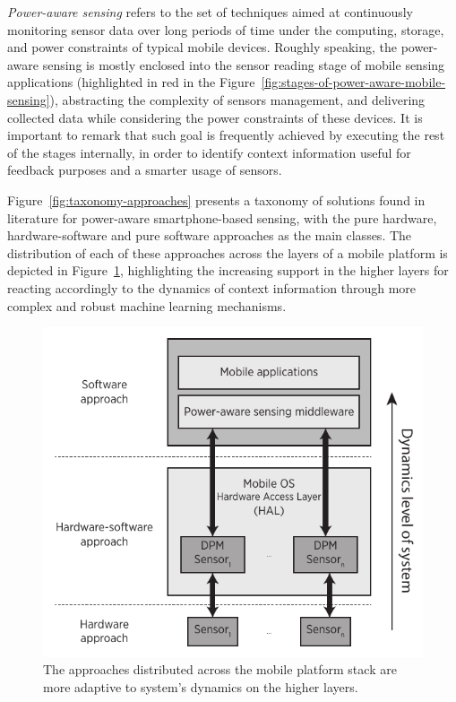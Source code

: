 \documentclass[ENG,PhD]{cinvestav}
\begin{document}
\emph{Power-aware sensing} refers to the set of techniques aimed at continuously monitoring sensor data over long periods of time under the computing, storage, and power constraints of typical mobile devices.
Roughly speaking, the power-aware sensing is mostly enclosed into the sensor reading stage of mobile sensing applications (highlighted in red in the Figure~\ref{fig:stages-of-power-aware-mobile-sensing}), abstracting the complexity of sensors management, and delivering collected data while considering the power constraints of these devices. 
It is important to remark that such goal is frequently achieved by executing the rest of the stages internally, in order to identify context information useful for feedback purposes and a smarter usage of sensors.

Figure~\ref{fig:taxonomy-approaches} presents a taxonomy of solutions found in literature for power-aware smartphone-based sensing, with the pure hardware, hardware-software and pure software approaches as the main classes.
The distribution of each of these approaches across the layers of a mobile platform is depicted in Figure~\ref{fig:distribution-approaches}, highlighting the increasing support in the higher layers for reacting accordingly to the dynamics of context information through more complex and robust machine learning mechanisms.
\begin{figure}[t]
  \centering
  \includegraphics[width=0.5\columnwidth]{approaches-distribution}
  \caption{The approaches distributed across the mobile platform stack are more adaptive to system's dynamics on the higher layers.}
  \label{fig:distribution-approaches}
\end{figure}
\end{document}
